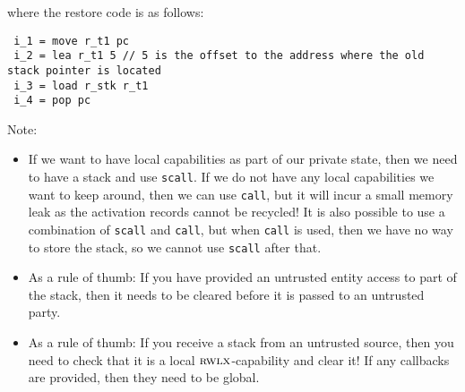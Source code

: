 \documentclass[a4paper]{article}
\newcommand{\plainperm}[1]{\textsc{#1}}
\newcommand{\rwlx}{\plainperm{rwlx}}
\begin{document}
where the restore code is as follows:
\begin{lstlisting}
 i_1 = move r_t1 pc
 i_2 = lea r_t1 5 // 5 is the offset to the address where the old stack pointer is located
 i_3 = load r_stk r_t1
 i_4 = pop pc
\end{lstlisting}
Note:
\begin{itemize}
\item If we want to have local capabilities as part of our private state, then we need to have a stack and use \texttt{scall}. If we do not have any local capabilities we want to keep around, then we can use \texttt{call}, but it will incur a small memory leak as the activation records cannot be recycled! It is also possible to use a combination of \texttt{scall} and \texttt{call}, but when \texttt{call} is used, then we have no way to store the stack, so we cannot use \texttt{scall} after that.
\item As a rule of thumb: If you have provided an untrusted entity access to part of the stack, then it needs to be cleared before it is passed to an untrusted party.
\item As a rule of thumb: If you receive a stack from an untrusted source, then you need to check that it is a local $\rwlx$-capability and clear it! If any callbacks are provided, then they need to be global.
\end{itemize}
\end{document}
